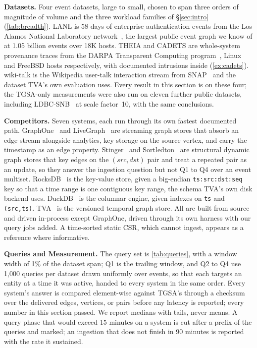 \documentclass[sigconf,nonacm]{acmart}
\newcommand{\sys}{TGSA\xspace}
\begin{document}
\textbf{Datasets.} Four event datasets, large to small, chosen to span
three orders of magnitude of volume and the three workload families of
\S\ref{sec:intro} (\cref{tab:breadth}). LANL is 58 days of enterprise
authentication events from the Los Alamos National Laboratory
network~\cite{lanl2015data}, the largest public event graph we know of
at 1.05 billion events over 18K hosts. THEIA and CADETS are whole-system
provenance traces from the DARPA Transparent Computing
program~\cite{darpa2020tc}, Linux and FreeBSD hosts respectively, with
documented intrusions inside (\cref{ex:cadets}). wiki-talk is the
Wikipedia user-talk interaction stream from SNAP~\cite{leskovec2014snap, paranjape2017motifs}
and the dataset TVA's own evaluation uses. Every result in this section
is on these four; the \sys-only measurements were also run on eleven
further public datasets, including LDBC-SNB~\cite{erling2015ldbc} at
scale factor~10, with the same conclusions.



\textbf{Competitors.} Seven systems, each run through its own fastest
documented path. GraphOne~\cite{kumar2019graphone} and
LiveGraph~\cite{zhu2020livegraph} are streaming graph stores that
absorb an edge stream alongside analytics, key storage on the source
vertex, and carry the timestamp as an edge property.
Stinger~\cite{ediger2012stinger} and Sortledton~\cite{fuchs2023sortledton}
are structural dynamic graph stores that key edges on the $(src,dst)$
pair and treat a repeated pair as an update, so they answer the
ingestion question but not Q1 to Q4 over an event multiset.
RocksDB~\cite{dong2021rocksdb} is the key-value store, given a
big-endian \texttt{ts:src:}\allowbreak\texttt{dst:seq} key so that a
time range is one contiguous key range, the schema TVA's own disk
backend uses. DuckDB~\cite{raasveldt2019duckdb} is the columnar engine,
given indexes on \texttt{ts} and \texttt{(src,ts)}.
TVA~\cite{li2026tva} is the versioned temporal graph store. All are
built from source and driven in-process except GraphOne, driven through
its own harness with our query jobs added. A time-sorted static CSR,
which cannot ingest, appears as a reference where informative.

\textbf{Queries and Measurement.} The query set is \cref{tab:queries},
with a window width of 1\% of the dataset span; Q1 is the trailing
window, and Q2 to Q4 use 1{,}000 queries per dataset drawn uniformly
over events, so that each targets an entity at a time it was active,
handed to every system in the same order. Every system's answer is
compared element-wise against \sys's through a checksum over the
delivered edges, vertices, or pairs before any latency is reported;
every number in this section passed. We report medians with tails,
never means. A query phase that would exceed 15 minutes on a system
is cut after a prefix of the queries and marked; an ingestion that
does not finish in 90 minutes is reported with the rate it sustained.
\end{document}
